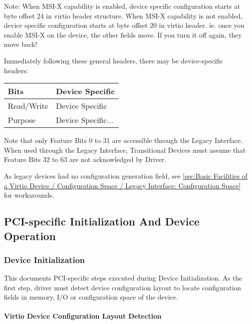 Note: When MSI-X capability is enabled, device specific configuration starts at
byte offset 24 in virtio header structure. When MSI-X capability is not
enabled, device specific configuration starts at byte offset 20 in virtio
header.  ie. once you enable MSI-X on the device, the other fields move.
If you turn it off again, they move back!

Immediately following these general headers, there may be
device-specific headers:

\begin{tabular}{ |l||l| }
\hline
Bits       & Device Specific \\
\hline
Read/Write & Device Specific \\
\hline
Purpose    & Device Specific... \\
\hline
\end{tabular}

Note that only Feature Bits 0 to 31 are accessible through the
Legacy Interface. When used through the Legacy Interface,
Transitional Devices must assume that Feature Bits 32 to 63
are not acknowledged by Driver.

As legacy devices had no configuration generation field,
see \ref{sec:Basic Facilities of a Virtio Device / Configuration Space / Legacy Interface: Configuration Space}~ for workarounds.

\subsection{PCI-specific Initialization And Device Operation}\label{sec:Virtio Transport Options / Virtio Over PCI Bus / PCI-specific Initialization And Device Operation}

\subsubsection{Device Initialization}\label{sec:Virtio Transport Options / Virtio Over PCI Bus / PCI-specific Initialization And Device Operation / Device Initialization}

This documents PCI-specific steps executed during Device Initialization.
As the first step, driver must detect device configuration layout
to locate configuration fields in memory, I/O or configuration space of the
device.

\paragraph{Virtio Device Configuration Layout Detection}\label{sec:Virtio Transport Options / Virtio Over PCI Bus / PCI-specific Initialization And Device Operation / Device Initialization / Virtio Device Configuration Layout Detection}

